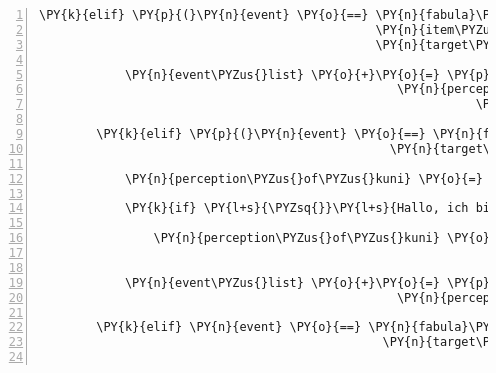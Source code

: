 \begin{Verbatim}[commandchars=\\\{\},numbers=left,firstnumber=1,stepnumber=1]
        \PY{k}{elif} \PY{p}{(}\PY{n}{event} \PY{o}{==} \PY{n}{fabula}\PY{o}{.}\PY{n}{TriesToDropEvent}\PY{p}{(}\PY{n}{identifier}\PY{o}{=}\PY{n}{ID\PYZus{}KUNI}\PY{p}{,}
                                               \PY{n}{item\PYZus{}identifier}\PY{o}{=}\PY{l+s}{\PYZsq{}}\PY{l+s}{goblet}\PY{l+s}{\PYZsq{}}\PY{p}{,}
                                               \PY{n}{target\PYZus{}identifier}\PY{o}{=}\PY{l+s}{\PYZsq{}}\PY{l+s}{dew}\PY{l+s}{\PYZsq{}}\PY{p}{)}\PY{p}{)}\PY{p}{:}

            \PY{n}{event\PYZus{}list} \PY{o}{+}\PY{o}{=} \PY{p}{[}\PY{n}{fabula}\PY{o}{.}\PY{n}{PerceptionEvent}\PY{p}{(}\PY{n}{identifier}\PY{o}{=}\PY{n}{ID\PYZus{}KUNI}\PY{p}{,}
                                                  \PY{n}{perception}\PY{o}{=}\PY{l+s}{\PYZsq{}}\PY{l+s}{Warum sollte ich den Blütenkelch mit Tau benetzen, }\PY{l+s}{\PYZsq{}}
                                                             \PY{l+s}{\PYZsq{}}\PY{l+s}{der sieht ganz sauber aus.}\PY{l+s}{\PYZsq{}}\PY{p}{)}\PY{p}{]}

        \PY{k}{elif} \PY{p}{(}\PY{n}{event} \PY{o}{==} \PY{n}{fabula}\PY{o}{.}\PY{n}{TriesToLookAtEvent}\PY{p}{(}\PY{n}{identifier}\PY{o}{=}\PY{n}{ID\PYZus{}CASSANDRA}\PY{p}{,}
                                                 \PY{n}{target\PYZus{}identifier}\PY{o}{=}\PY{n}{ID\PYZus{}KUNI}\PY{p}{)}\PY{p}{)}\PY{p}{:}

            \PY{n}{perception\PYZus{}of\PYZus{}kuni} \PY{o}{=} \PY{l+s}{\PYZsq{}}\PY{l+s}{Der Gnom Kuni.}\PY{l+s}{\PYZsq{}}

            \PY{k}{if} \PY{l+s}{\PYZsq{}}\PY{l+s}{Hallo, ich bin der Gnom Kuni.}\PY{l+s}{\PYZsq{}} \PY{o+ow}{in} \PY{n+nb+bp}{self}\PY{o}{.}\PY{n}{sentences\PYZus{}kuni}\PY{p}{:}

                \PY{n}{perception\PYZus{}of\PYZus{}kuni} \PY{o}{=} \PY{l+s}{\PYZsq{}}\PY{l+s}{Ein kleiner Gnom, ob der wohl weiß, wo es zum Zauberwald geht?}\PY{l+s}{\PYZsq{}}


            \PY{n}{event\PYZus{}list} \PY{o}{+}\PY{o}{=} \PY{p}{[}\PY{n}{fabula}\PY{o}{.}\PY{n}{PerceptionEvent}\PY{p}{(}\PY{n}{identifier}\PY{o}{=}\PY{n}{ID\PYZus{}CASSANDRA}\PY{p}{,}
                                                  \PY{n}{perception}\PY{o}{=}\PY{n}{perception\PYZus{}of\PYZus{}kuni}\PY{p}{)}\PY{p}{]}

        \PY{k}{elif} \PY{n}{event} \PY{o}{==} \PY{n}{fabula}\PY{o}{.}\PY{n}{TriesToLookAtEvent}\PY{p}{(}\PY{n}{identifier}\PY{o}{=}\PY{n}{ID\PYZus{}KUNI}\PY{p}{,}
                                                \PY{n}{target\PYZus{}identifier}\PY{o}{=}\PY{n}{ID\PYZus{}CASSANDRA}\PY{p}{)}\PY{p}{:}


\end{Verbatim}
